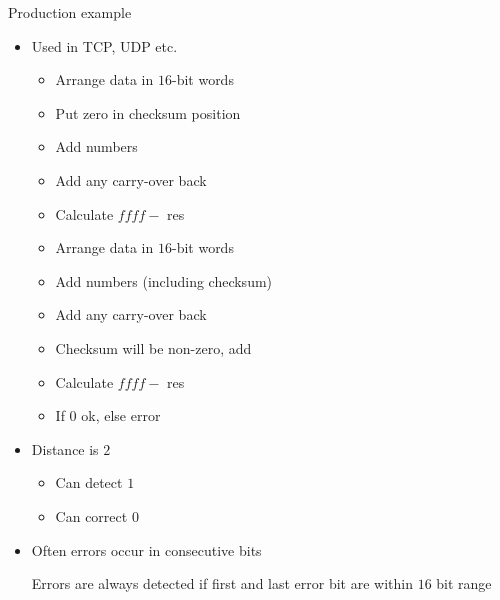\begin{itemize}
\begin{itemize}
\begin{itemize}
                     Production example
                        \begin{itemize}
                            \item Used in TCP, UDP etc.
                                \begin{itemize}
                                    \item Arrange data in $16$-bit words
                                    \item Put zero in checksum position
                                    \item Add numbers
                                    \item Add any carry-over back
                                    \item Calculate $ffff -$ res
                                \end{itemize}
                                \begin{itemize}
                                    \item Arrange data in $16$-bit words
                                    \item Add numbers (including checksum)
                                    \item Add any carry-over back
                                    \item Checksum will be non-zero, add
                                    \item Calculate $ffff -$ res
                                    \item If $0$ ok, else error
                                \end{itemize}
                            \item Distance is $2$
                                \begin{itemize}
                                    \item Can detect $1$
                                    \item Can correct $0$
                                \end{itemize}
                            \item Often errors occur in consecutive bits
                                \begin{itemize}
                                    \ipro Errors are always detected if first and last error bit are within $16$ bit range

\end{itemize}
\end{itemize}
\end{itemize}
\end{itemize}
\end{itemize}
